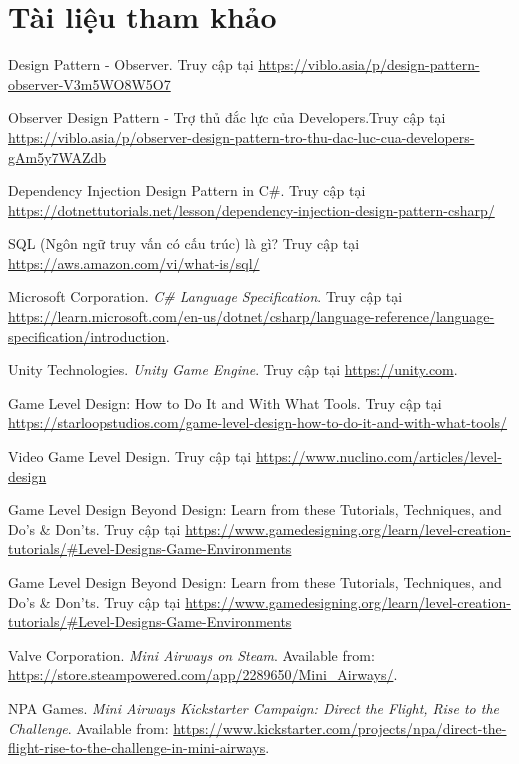 \section{Tài liệu tham khảo}
\begin{thebibliography}{1}
		
	Design Pattern - Observer. Truy cập tại \url{https://viblo.asia/p/design-pattern-observer-V3m5WO8W5O7}
	
	Observer Design Pattern - Trợ thủ đắc lực của Developers.Truy cập tại
	\url{https://viblo.asia/p/observer-design-pattern-tro-thu-dac-luc-cua-developers-gAm5y7WAZdb}

	
	 Dependency Injection Design Pattern in C\#. Truy cập tại \url{https://dotnettutorials.net/lesson/dependency-injection-design-pattern-csharp/}
	
	SQL (Ngôn ngữ truy vấn có cấu trúc) là gì? Truy cập tại \url{https://aws.amazon.com/vi/what-is/sql/}
	
	Microsoft Corporation. \textit{C\# Language Specification}. Truy cập tại \url{https://learn.microsoft.com/en-us/dotnet/csharp/language-reference/language-specification/introduction}.
	
	Unity Technologies. \textit{Unity Game Engine}. Truy cập tại \url{https://unity.com}.
	
	
	 Game Level Design: How to Do It and With What Tools. Truy cập tại \url{https://starloopstudios.com/game-level-design-how-to-do-it-and-with-what-tools/}
	
	 Video Game Level Design. Truy cập tại \url{https://www.nuclino.com/articles/level-design}
	
	 Game Level Design Beyond Design: Learn from these Tutorials, Techniques, and Do’s \& Don’ts. Truy cập tại \url{https://www.gamedesigning.org/learn/level-creation-tutorials/#Level-Designs-Game-Environments}
	
	 Game Level Design Beyond Design: Learn from these Tutorials, Techniques, and Do’s \& Don’ts. Truy cập tại \url{https://www.gamedesigning.org/learn/level-creation-tutorials/#Level-Designs-Game-Environments}
	
	Valve Corporation. \textit{Mini Airways on Steam}. Available from: \url{https://store.steampowered.com/app/2289650/Mini_Airways/}.
	
	NPA Games. \textit{Mini Airways Kickstarter Campaign: Direct the Flight, Rise to the Challenge}. Available from: \url{https://www.kickstarter.com/projects/npa/direct-the-flight-rise-to-the-challenge-in-mini-airways}.
	

\end{thebibliography}
